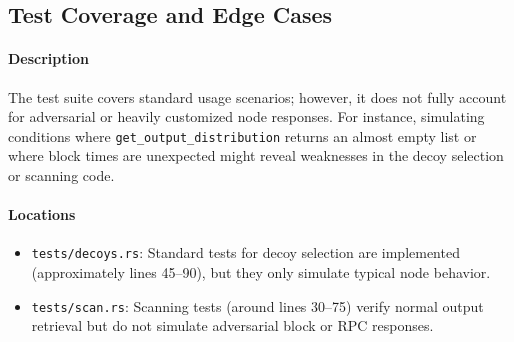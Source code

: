 \documentclass[12pt,a4paper]{article}
\begin{document}
%
%
%
\subsection{Test Coverage and Edge Cases}
\label{sec:monero-wallet-test-coverage}
\paragraph{Description}
The test suite covers standard usage scenarios; however, it does not fully account for adversarial or heavily customized node responses. For instance, simulating conditions where \texttt{get\_output\_distribution} returns an almost empty list or where block times are unexpected might reveal weaknesses in the decoy selection or scanning code.

\paragraph{Locations}
\begin{itemize}
  \item \texttt{tests/decoys.rs}: Standard tests for decoy selection are implemented (approximately lines 45--90), but they only simulate typical node behavior.
  \item \texttt{tests/scan.rs}: Scanning tests (around lines 30--75) verify normal output retrieval but do not simulate adversarial block or RPC responses.
\end{itemize}
\end{document}
